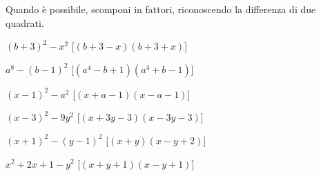 
\begin{esercizio}[\Ast]
\label{ese:div.018}
Quando è possibile, scomponi in fattori, riconoscendo la differenza di due 
quadrati.
\begin{multicols}{2}
\begin{enumeratea}
 \item $(b+3)^{2}-x^{2}$ \hfill [$(b+3-x)(b+3+x)$]
 \item $a^{8}-(b-1)^{2}$ \hfill [$(a^{4}-b+1)(a^{4}+b-1)$]
 \item $(x-1)^{2}-a^{2}$ \hfill [$(x+a-1)(x-a-1)$]
 \item $(x-3)^{2}-9y^{2}$ \hfill [$(x+3y-3)(x-3y-3)$]
 \item $(x+1)^{2}-(y-1)^{2}$ \hfill [$(x+y)(x-y+2)$]
 \item $x^{2}+2x+1-y^{2}$ \hfill [$(x+y+1)(x-y+1)$]
\end{enumeratea}
\end{multicols}
\end{esercizio}

